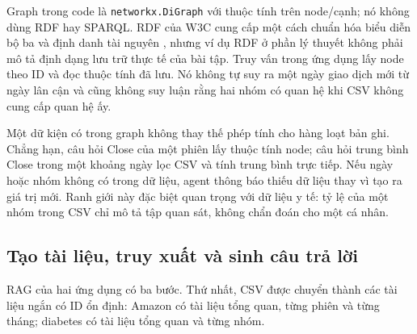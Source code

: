 \documentclass[12pt,a4paper]{report}
\begin{document}
Graph trong code là \texttt{networkx.DiGraph} với thuộc tính trên node/cạnh; nó không dùng RDF hay SPARQL. RDF của W3C cung cấp một cách chuẩn hóa biểu diễn bộ ba và định danh tài nguyên \cite{essay03-w3c}, nhưng ví dụ RDF ở phần lý thuyết không phải mô tả định dạng lưu trữ thực tế của bài tập. Truy vấn trong ứng dụng lấy node theo ID và đọc thuộc tính đã lưu. Nó không tự suy ra một ngày giao dịch mới từ ngày lân cận và cũng không suy luận rằng hai nhóm có quan hệ khi CSV không cung cấp quan hệ ấy.

Một dữ kiện có trong graph không thay thế phép tính cho hàng loạt bản ghi. Chẳng hạn, câu hỏi Close
của một phiên lấy thuộc tính node; câu hỏi trung bình Close trong một khoảng ngày lọc CSV và tính
trung bình trực tiếp. Nếu ngày hoặc nhóm không có trong dữ liệu, agent thông báo thiếu dữ liệu
thay vì tạo ra giá trị mới. Ranh giới này đặc biệt quan trọng với dữ liệu y tế: tỷ lệ của một nhóm
trong CSV chỉ mô tả tập quan sát, không chẩn đoán cho một cá nhân.

\subsection{Tạo tài liệu, truy xuất và sinh câu trả lời}
RAG của hai ứng dụng có ba bước. Thứ nhất, CSV được chuyển thành các tài liệu ngắn có ID ổn định:
Amazon có tài liệu tổng quan, từng phiên và từng tháng; diabetes có tài liệu tổng quan và từng nhóm.
\end{document}
